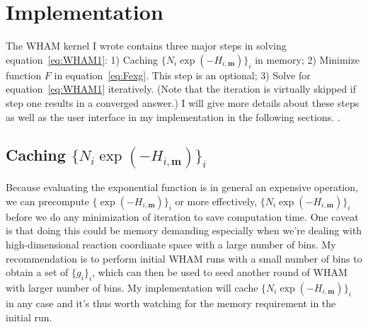 \section{Implementation}

The WHAM kernel I wrote contains three major steps in solving
equation~\ref{eq:WHAM1}: 
1) Caching $\{N_{i}\exp(-H_{i,\mathbf{m}})\}_{i}$ in memory;
2) Minimize function $F$ in equation~\ref{eq:Fexg}. This step is an optional;
3) Solve for equation~\ref{eq:WHAM1} iteratively. (Note that the iteration is
virtually skipped if step one results in a converged answer.) 
I will give more details about these steps as well as the user interface
in my implementation in the following sections. . 

\subsection{Caching $\{N_{i}\exp(-H_{i,\mathbf{m}})\}_{i}$}
Because evaluating the exponential function is in general an expensive 
operation, we can precompute $\{\exp(-H_{i,\mathbf{m}})\}_{i}$ or more effectively, 
$\{N_{i}\exp(-H_{i,\mathbf{m}})\}_{i}$ before we do any minimization of iteration
to save computation time. One caveat is that doing this could be 
memory demanding especially when we're dealing with high-dimensional 
reaction coordinate space with a large number of bins. My recommendation 
is to perform initial WHAM runs with a small number of bins to obtain 
a set of $\{g_{i}\}_{i}$, which can then be used to seed another round
of WHAM with larger number of bins. My implementation will cache
$\{N_{i}\exp(-H_{i,\mathbf{m}})\}_{i}$ in any case and it's thus worth watching 
for the memory requirement in the initial run.

